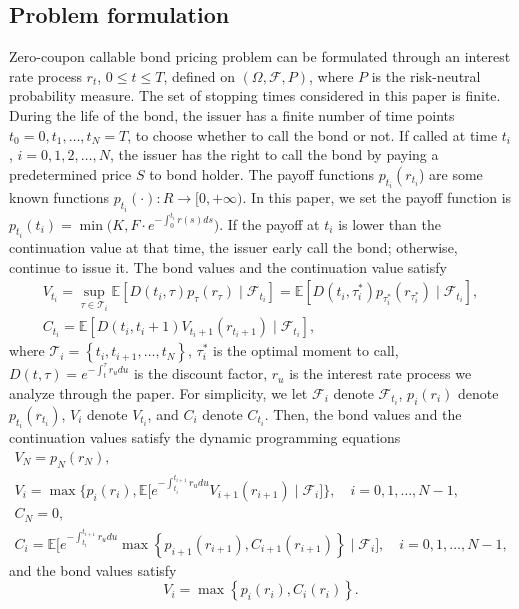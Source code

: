 \documentclass[reqno]{amsart}
\begin{document}
\subsection{Problem formulation}
\label{lower}
Zero-coupon callable bond pricing problem can be formulated through an interest rate 
process
$ r_{t}$, $0 \leq t \leq T $, defined on $\left( \Omega, \mathcal{F}, P \right)$, where 
$P$ is the risk-neutral probability measure. The set of stopping times considered in 
this paper is finite. During the life of the bond, the issuer has a finite number of 
time points $t_0=0,t_1,\dots,t_N=T$, to choose whether to call the bond or not.
If called at time $t_{i}$, $i=0,1,2, \dots, N$, the issuer has the right to call the
 bond by paying a predetermined price $S$ to bond holder.
The payoff functions
$p_{t_i}\left(r_{t_{i}}\right.$) are some known functions 
$p_{t_i}(\cdot):R \to [0,+\infty)$.
In this paper, we set the payoff function is
$p_{t_i}(t_i)=\min \big(K, F \cdot e^{-\int_0^{t_i} r(s) d s}\big)$.
If the payoff at $t_i$ is lower than the continuation value at that time, the 
issuer early call the bond; otherwise, continue to issue it. The bond values and the
continuation value satisfy
\begin{gather*}
V_{t_i}=\sup _{\tau \in \mathcal{T}_{i}} \mathbb{E}\left[D\left(t_i, \tau\right) 
p_{\tau}\left(r_{\tau}\right) \mid \mathcal{F}_{t_i} \right]
=\mathbb{E}\left[D\left(t_i, \tau^{\ast }_i \right) p_{\tau^{\ast }_i }
\left(r_{\tau^{\ast }_i }\right) \mid \mathcal{F}_{t_i} \right],
\\
 C_{t_i}=\mathbb{E}\left[D\left(t_i, t_i+1\right) V_{t_i+1}
 \left(r_{t_i+1}\right) \mid \mathcal{F}_{t_i}\right],
\end{gather*}
where $\mathcal{T}_{i}=\left\{t_{i}, t_{i+1}, \dots, t_{N}\right\}$,
$\tau^{\ast }_i$ is the optimal moment to call, 
$D\left(t, \tau\right)=e^{-\int_{t}^{\tau} r_{u} d u}$ is the discount factor,
$r_{u}$ is the interest rate process we analyze through the paper.
For simplicity, we let $\mathcal{F}_i$ denote $\mathcal{F}_{t_i}$, 
$p_{i}\left(r_{i}\right)$ denote $p_{t_{i}}\left(r_{t_{i}}\right)$, $V_{i}$ denote $V_{t_i}$, and $C_{i}$ denote $C_{t_i}$. Then, the bond values and the continuation values satisfy the dynamic programming equations
\begin{equation}
\label{dynamic}
\begin{gathered}
V_{N}=p_{N}\left(r_N\right), \\
V_{i}=\max \Big\{p_{i}\left(r_i\right), \mathbb{E}\Big[
e^{-\int_{t_i}^{t_{i+1}} r_{u} d u} V_{i+1}\left(r_{i+1}\right) 
\mid \mathcal{F}_i\Big]\Big\}, \quad i=0,1, \dots, N-1 ,\\
C_{N}=0, \\
C_{i}=\mathbb{E}\Big[
e^{-\int_{t_i}^{t_{i+1}} r_{u} d u}
\max \left\{p_{i+1}\left(r_{i+1}\right), C_{i+1}
\left(r_{i+1}\right)\right\} \mid \mathcal{F}_i\Big], \quad i=0,1, \dots, N-1 ,
\end{gathered}
\end{equation}
and the bond values satisfy
\[
V_{i}=\max \left\{p_{i}\left(r_i\right), C_{i}\left(r_i\right)\right\} .
\]
\end{document}

